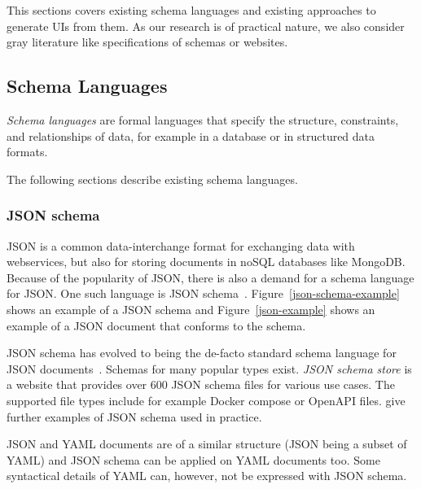 
This sections covers existing schema languages and existing approaches to generate UIs from them.
As our research is of practical nature, we also consider gray literature like specifications of schemas or websites.
\subsection{Schema Languages}\label{subsec:schemalanguages}

\textit{Schema languages} are formal languages that specify the structure, constraints, and relationships of data, for example in a database or in structured data formats.

The following sections describe existing schema languages.

\subsubsection{JSON schema}

JSON is a common data-interchange format for exchanging data with webservices, but also for storing documents in noSQL databases like MongoDB\@.
Because of the popularity of JSON, there is also a demand for a schema language for JSON\@.
One such language is JSON schema~\cite{jsonSchema, jsonschemaJSONSchema}.
Figure~\ref{json-schema-example} shows an example of a JSON schema and Figure~\ref{json-example} shows an example of a JSON document that conforms to the schema.

JSON schema has evolved to being the de-facto standard schema language for JSON documents~\cite{baazizi2021empirical}.
Schemas for many popular \cfgfile{} types exist.
\textit{JSON schema store}\cite{schemastoreJSONSchema} is a website that provides over 600 JSON schema files for various use cases.
The supported file types include for example Docker compose or OpenAPI files.
\cite{barbaglia, ChaeronySiffa2022} give further examples of JSON schema used in practice.

JSON and YAML documents are of a similar structure (JSON being a subset of YAML) and JSON schema can be applied on YAML documents too.
Some syntactical details of YAML can, however, not be expressed with JSON schema. %

